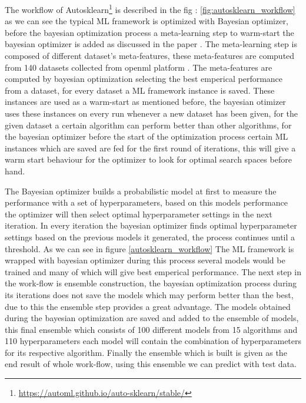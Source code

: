 The workflow of Autosklearn\footnote{\url{https://automl.github.io/auto-sklearn/stable/}} is described in the fig : \ref{fig:autosklearn_workflow} as we can see the typical ML framework is optimized with Bayesian optimizer, before the bayesian optimization process a meta-learning step to warm-start the bayesian optimizer is added as discussed in the paper \cite{autosklearn}. The meta-learning step is composed of different dataset's meta-features, these meta-features are computed from 140 datasets collected from openml platform \cite{OpenML2013}. The meta-features are computed by bayesian optimization selecting the best emperical performance from a dataset, for every dataset a ML framework instance is saved. These instances are used as a warm-start as mentioned before, the bayesian otimizer uses these instances on every run whenever a new dataset has been given, for the given dataset a certain algorithm can perform better than other algorithms, for the bayesian optimizer before the start of the optimization process certain ML instances which are saved are fed for the first round of iterations, this will give a warm start behaviour for the optimizer to look for optimal search spaces before hand.
        
The Bayesian optimizer builds a probabilistic model at first to measure the performance with a set of hyperparameters, based on this models performance the optimizer will then select optimal hyperparameter settings in the next iteration\cite{autosklearn}. In every iteration the bayesian  optimizer finds optimal hyperparameter settings based on the previous models it generated, the process continues until a threshold.
As we can see in figure \ref{autosklearn_workflow} The ML framework is wrapped with bayesian optimizer during this process several models would be trained and many of which will give best emperical performance. The next step in the work-flow is ensemble construction, the bayesian optimization process during its iterations does not save the models which may perform better than the best, due to this the ensemble step provides a great advantage. The models obtained during the bayesian optimization are saved and added to the ensemble of models, this final ensemble which consists of 100 different models from 15 algorithms and 110 hyperparameters\cite{autosklearn} each model will contain the combination of hyperparameters for its respective algorithm.
Finally the ensemble which is built is given as the end result of whole work-flow, using this ensemble we can predict with test data.
    
